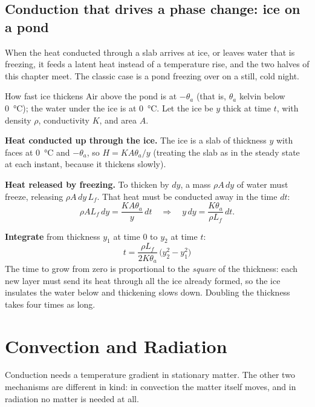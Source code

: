 \subsection{Conduction that drives a phase change: ice on a pond}

When the heat conducted through a slab arrives at ice, or leaves water that is freezing, it feeds a
latent heat instead of a temperature rise, and the two halves of this chapter meet. The classic case is
a pond freezing over on a still, cold night.

\begin{derivbox}{How fast ice thickens}
Air above the pond is at $-\theta_a$ (that is, $\theta_a$ kelvin below \SI{0}{\celsius}); the water
under the ice is at \SI{0}{\celsius}. Let the ice be $y$ thick at time $t$, with density $\rho$,
conductivity $K$, and area $A$.

 \textbf{Heat conducted up through the ice.} The ice is a slab of thickness $y$ with faces at
\SI{0}{\celsius} and $-\theta_a$, so $H = KA\theta_a/y$ (treating the slab as in the steady state at
each instant, because it thickens slowly).

 \textbf{Heat released by freezing.} To thicken by $dy$, a mass $\rho A\,dy$ of water must
freeze, releasing $\rho A\,dy\,L_f$. That heat must be conducted away in the time $dt$:
\[
\rho A L_f\,dy = \frac{KA\theta_a}{y}\,dt
\quad\Longrightarrow\quad
y\,dy = \frac{K\theta_a}{\rho L_f}\,dt .
\]

 \textbf{Integrate} from thickness $y_1$ at time $0$ to $y_2$ at time $t$:
\[
\boxed{\;t = \frac{\rho L_f}{2K\theta_a}\,\bigl(y_2^2 - y_1^2\bigr)\;}
\]
The time to grow from zero is proportional to the \emph{square} of the thickness: each new layer must
send its heat through all the ice already formed, so the ice insulates the water below and thickening
slows down. Doubling the thickness takes four times as long.
\end{derivbox}

\section{Convection and Radiation}\label{sec:convection}

Conduction needs a temperature gradient in stationary matter. The other two mechanisms are different
in kind: in convection the matter itself moves, and in radiation no matter is needed at all.

